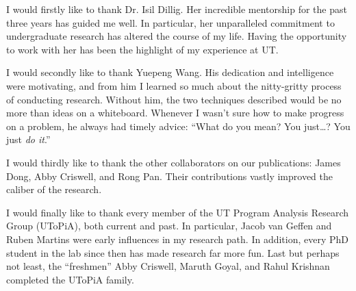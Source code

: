 \documentclass[]{article}
\begin{document}
        I would firstly like to thank Dr. Isil Dillig. Her incredible mentorship for the past three years has guided me well. In particular, her unparalleled commitment to undergraduate research has altered the course of my life. Having the opportunity to work with her has been the highlight of my experience at UT. 

        I would secondly like to thank Yuepeng Wang. His dedication and intelligence were motivating, and from him I learned so much about the nitty-gritty process of conducting research. Without him, the two techniques described would be no more than ideas on a whiteboard. Whenever I wasn't sure how to make progress on a problem, he always had timely advice: ``What do you mean? You just\ldots? You just \textit{do it}.''

        I would thirdly like to thank the other collaborators on our publications: James Dong, Abby Criswell, and Rong Pan. Their contributions vastly improved the caliber of the research. 

        I would finally like to thank every member of the UT Program Analysis Research Group (UToPiA), both current and past. In particular, Jacob van Geffen and Ruben Martins were early influences in my research path. In addition, every PhD student in the lab since then has made research far more fun. Last but perhaps not least, the ``freshmen'' Abby Criswell, Maruth Goyal, and Rahul Krishnan completed the UToPiA family. 


    
    




\end{document}
